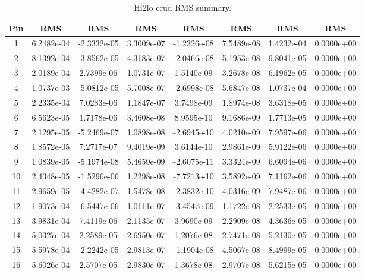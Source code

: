\begin{table}[h]
    \begin{center}
        \caption[Hi2lo crud RMS summary.]{Hi2lo crud RMS summary.}
    \begin{tabular}[h]{|c|c|c|c|c|c|c|c|} 
        \hline
Pin  & RMS & RMS & RMS & RMS & RMS & RMS & RMS \\
\hline
1  & 6.2482e-04 & -2.3332e-05 & 3.3009e-07 & -1.2326e-08 & 7.5489e-08 & 1.4232e-04 & 0.0000e+00 \\ 
2  & 8.1392e-04 & -3.8562e-05 & 4.3183e-07 & -2.0466e-08 & 5.1953e-08 & 9.8041e-05 & 0.0000e+00 \\ 
3  & 2.0189e-04 & 2.7399e-06 & 1.0731e-07 & 1.5140e-09 & 3.2678e-08 & 6.1962e-05 & 0.0000e+00 \\ 
4  & 1.0737e-03 & -5.0812e-05 & 5.7008e-07 & -2.6998e-08 & 5.6847e-08 & 1.0737e-04 & 0.0000e+00 \\ 
5  & 2.2335e-04 & 7.0283e-06 & 1.1847e-07 & 3.7498e-09 & 1.8974e-08 & 3.6318e-05 & 0.0000e+00 \\ 
6  & 6.5623e-05 & 1.7178e-06 & 3.4608e-08 & 8.9595e-10 & 9.1686e-09 & 1.7713e-05 & 0.0000e+00 \\ 
7  & 2.1295e-05 & -5.2469e-07 & 1.0898e-08 & -2.6945e-10 & 4.0210e-09 & 7.9597e-06 & 0.0000e+00 \\ 
8  & 1.8572e-05 & 7.2717e-07 & 9.4019e-09 & 3.6144e-10 & 2.9861e-09 & 5.9122e-06 & 0.0000e+00 \\ 
9  & 1.0839e-05 & -5.1974e-08 & 5.4659e-09 & -2.6075e-11 & 3.3324e-09 & 6.6094e-06 & 0.0000e+00 \\ 
10  & 2.4348e-05 & -1.5296e-06 & 1.2298e-08 & -7.7213e-10 & 3.5892e-09 & 7.1162e-06 & 0.0000e+00 \\ 
11  & 2.9659e-05 & -4.4282e-07 & 1.5478e-08 & -2.3832e-10 & 4.0316e-09 & 7.9487e-06 & 0.0000e+00 \\ 
12  & 1.9073e-04 & -6.5447e-06 & 1.0111e-07 & -3.4547e-09 & 1.1722e-08 & 2.2533e-05 & 0.0000e+00 \\ 
13  & 3.9831e-04 & 7.4119e-06 & 2.1135e-07 & 3.9690e-09 & 2.2909e-08 & 4.3636e-05 & 0.0000e+00 \\ 
14  & 5.0327e-04 & 2.2589e-05 & 2.6950e-07 & 1.2076e-08 & 2.7471e-08 & 5.2130e-05 & 0.0000e+00 \\ 
15  & 5.5978e-04 & -2.2242e-05 & 2.9813e-07 & -1.1904e-08 & 4.5067e-08 & 8.4999e-05 & 0.0000e+00 \\ 
16  & 5.6026e-04 & 2.5707e-05 & 2.9830e-07 & 1.3678e-08 & 2.9707e-08 & 5.6215e-05 & 0.0000e+00 \\ 

\end{tabular}
\end{center}
\end{table}
